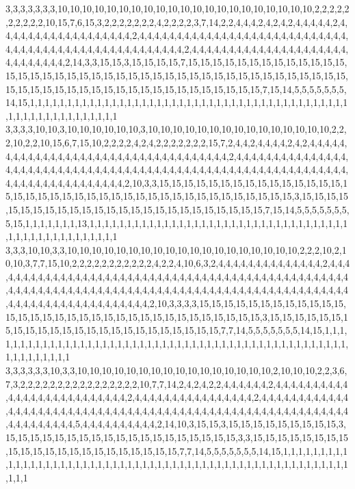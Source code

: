3,3,3,3,3,3,3,10,10,10,10,10,10,10,10,10,10,10,10,10,10,10,10,10,10,10,10,10,2,2,2,2,2,2,2,2,2,2,10,15,7,6,15,3,2,2,2,2,2,2,2,4,2,2,2,2,3,7,14,2,2,4,4,4,2,4,2,4,2,4,4,4,4,4,2,4,4,4,4,4,4,4,4,4,4,4,4,4,4,4,4,4,4,2,4,4,4,4,4,4,4,4,4,4,4,4,4,4,4,4,4,4,4,4,4,4,4,4,4,4,4,4,4,4,4,4,4,4,4,4,4,4,4,4,4,4,4,4,4,4,4,4,4,4,4,4,2,4,4,4,4,4,4,4,4,4,4,4,4,4,4,4,4,4,4,4,4,4,4,4,4,4,4,4,4,4,2,14,3,3,15,15,3,15,15,15,15,7,15,15,15,15,15,15,15,15,15,15,15,15,15,15,15,15,15,15,15,15,15,15,15,15,15,15,15,15,15,15,15,15,15,15,15,15,15,15,15,15,15,15,15,15,15,15,15,15,15,15,15,15,15,15,15,15,15,15,15,15,15,15,7,15,14,5,5,5,5,5,5,5,14,15,1,1,1,1,1,1,1,1,1,1,1,1,1,1,1,1,1,1,1,1,1,1,1,1,1,1,1,1,1,1,1,1,1,1,1,1,1,1,1,1,1,1,1,1,1,1,1,1,1,1,1,1,1,1,1,1,1,1
3,3,3,3,10,10,3,10,10,10,10,10,10,3,10,10,10,10,10,10,10,10,10,10,10,10,10,10,10,2,2,2,10,2,2,10,15,6,7,15,10,2,2,2,2,4,2,4,2,2,2,2,2,2,2,15,7,2,4,4,2,4,4,4,4,2,4,2,4,4,4,4,4,4,4,4,4,4,4,4,4,4,4,4,4,4,4,4,4,4,4,4,4,4,4,4,4,4,4,4,4,4,4,2,4,4,4,4,4,4,4,4,4,4,4,4,4,4,4,4,4,4,4,4,4,4,4,4,4,4,4,4,4,4,4,4,4,4,4,4,4,4,4,4,4,4,4,4,4,4,4,4,4,4,4,4,4,4,4,4,4,4,4,4,4,4,4,4,4,4,4,4,4,4,4,4,4,4,4,4,4,2,10,3,3,15,15,15,15,15,15,15,15,15,15,15,15,15,15,15,15,15,15,15,15,15,15,15,15,15,15,15,15,15,15,15,15,15,15,15,15,15,15,15,3,15,15,15,15,15,15,15,15,15,15,15,15,15,15,15,15,15,15,15,15,15,15,15,15,15,7,15,14,5,5,5,5,5,5,5,5,15,1,1,1,1,1,1,1,13,1,1,1,1,1,1,1,1,1,1,1,1,1,1,1,1,1,1,1,1,1,1,1,1,1,1,1,1,1,1,1,1,1,1,1,1,1,1,1,1,1,1,1,1,1,1,1,1,1,1
3,3,3,10,10,3,3,10,10,10,10,10,10,10,10,10,10,10,10,10,10,10,10,10,10,10,2,2,2,10,2,10,10,3,7,7,15,10,2,2,2,2,2,2,2,2,2,2,2,4,2,2,4,10,6,3,2,4,4,4,4,4,4,4,4,4,4,4,4,4,4,2,4,4,4,4,4,4,4,4,4,4,4,4,4,4,4,4,4,4,4,4,4,4,4,4,4,4,4,4,4,4,4,4,4,4,4,4,4,4,4,4,4,4,4,4,4,4,4,4,4,4,4,4,4,4,4,4,4,4,4,4,4,4,4,4,4,4,4,4,4,4,4,4,4,4,4,4,4,4,4,4,4,4,4,4,4,4,4,4,4,4,4,4,4,4,4,4,4,4,4,4,4,4,4,4,4,4,4,4,4,4,4,4,4,4,2,10,3,3,3,3,15,15,15,15,15,15,15,15,15,15,15,15,15,15,15,15,15,15,15,15,15,15,15,15,15,15,15,15,15,15,15,15,15,3,15,15,15,15,15,15,15,15,15,15,15,15,15,15,15,15,15,15,15,15,15,15,15,15,7,7,14,5,5,5,5,5,5,5,14,15,1,1,1,1,1,1,1,1,1,1,1,1,1,1,1,1,1,1,1,1,1,1,1,1,1,1,1,1,1,1,1,1,1,1,1,1,1,1,1,1,1,1,1,1,1,1,1,1,1,1,1,1,1,1,1,1,1,1
3,3,3,3,3,3,10,3,3,10,10,10,10,10,10,10,10,10,10,10,10,10,10,10,10,2,10,10,10,2,2,3,6,7,3,2,2,2,2,2,2,2,2,2,2,2,2,2,2,2,2,10,7,7,14,2,4,2,4,2,2,4,4,4,4,4,4,2,4,4,4,4,4,4,4,4,4,4,4,4,4,4,4,4,4,4,4,4,4,4,4,4,4,4,2,4,4,4,4,4,4,4,4,4,4,4,4,4,4,4,4,2,4,4,4,4,4,4,4,4,4,4,4,4,4,4,4,4,4,4,4,4,4,4,4,4,4,4,4,4,4,4,4,4,4,4,4,4,4,4,4,4,4,4,4,4,4,4,4,4,4,4,4,4,4,4,4,4,4,4,4,4,4,4,4,4,4,4,4,5,4,4,4,4,4,4,4,4,4,4,2,14,10,3,15,15,3,15,15,15,15,15,15,15,15,15,3,15,15,15,15,15,15,15,15,15,15,15,15,15,15,15,15,15,15,15,3,3,15,15,15,15,15,15,15,15,15,15,15,15,15,15,15,15,15,15,15,15,15,15,7,7,14,5,5,5,5,5,5,5,14,15,1,1,1,1,1,1,1,1,1,1,1,1,1,1,1,1,1,1,1,1,1,1,1,1,1,1,1,1,1,1,1,1,1,1,1,1,1,1,1,1,1,1,1,1,1,1,1,1,1,1,1,1,1,1,1,1,1,1

